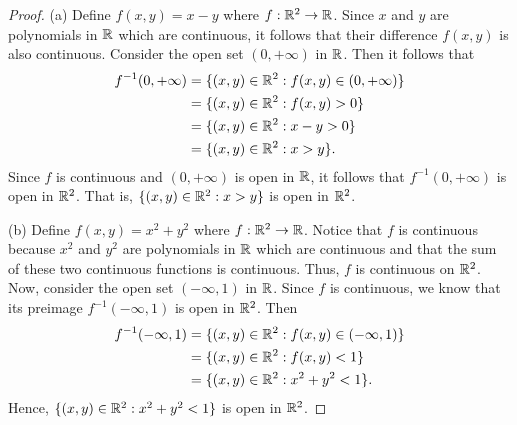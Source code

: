 \documentclass[a4paper]{article}
\begin{document}
\begin{problem}
\begin{enumerate}
\begin{proof}
                (a) Define \( f(x,y) = x - y  \) where \( f: \mathbb{R}^{2} \to \mathbb{R} \). Since \( x  \) and \( y  \) are polynomials in \( \mathbb{R}  \) which are continuous, it follows that their difference \( f(x,y) \) is also continuous. Consider the open set \( (0,+\infty ) \) in \( \mathbb{R} \). Then it follows that 
                \begin{align*}
                   f^{-1}(0,+\infty )  &= \{ (x,y) \in \mathbb{R}^{2} : f(x,y) \in (0,+\infty ) \}  \\
                                       &= \{ (x,y) \in \mathbb{R}^{2} : f(x,y) > 0 \}  \\
                                       &= \{ (x,y) \in \mathbb{R}^{2} : x - y > 0 \} \\
                                       &= \{ (x,y) \in \mathbb{R}^{2} : x > y  \}.
                \end{align*}
            Since \( f \) is continuous and \( (0,+\infty ) \) is open in \( \mathbb{R} \), it follows that \( f^{-1}(0,+\infty ) \) is open in \( \mathbb{R}^{2} \). That is, \( \{ (x,y) \in \mathbb{R}^{2} : x > y \}   \) is open in \( \mathbb{R}^{2} \). 

                (b) Define \( f(x,y) = x^{2} + y^{2} \) where \( f: \mathbb{R}^{2} \to \mathbb{R} \). Notice that \( f \) is continuous because \( x^{2} \) and \( y^{2} \) are polynomials in \( \mathbb{R} \) which are continuous and that the sum of these two continuous functions is continuous. Thus, \( f \) is continuous on \( \mathbb{R}^{2} \). Now, consider the open set \( (-\infty , 1 )  \) in \( \mathbb{R} \). Since \( f  \) is continuous, we know that its preimage \( f^{-1}(-\infty , 1 ) \) is open in \( \mathbb{R}^{2} \). Then
            \begin{align*}
                f^{-1}(-\infty , 1) &= \{ (x,y) \in \mathbb{R}^{2} : f(x,y) \in (-\infty , 1) \}  \\
                                    &= \{ (x,y) \in \mathbb{R}^{2} : f(x,y) < 1  \}  \\
                                    &= \{ (x,y) \in \mathbb{R}^{2} : x^{2} + y^{2} < 1  \}.
            \end{align*}
            Hence, \( \{ (x,y) \in \mathbb{R}^{2} : x^{2} + y^{2} < 1  \}  \) is open in \( \mathbb{R}^{2} \).
 

\end{proof}
\end{enumerate}
\end{problem}
\end{document}
